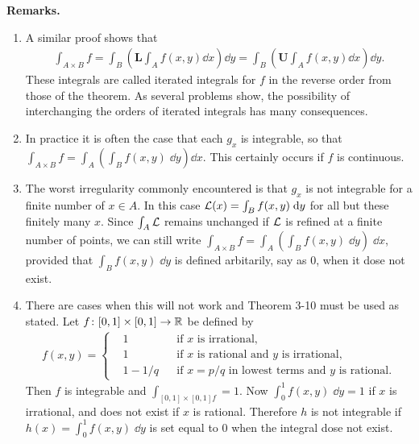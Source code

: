 \noindent\textbf{Remarks.} 
\begin{enumerate}[label={\textup{\arabic*.\,}}]
    \item A similar proof shows that
        \begin{align*}
            \int_{A\times B}f
            = \int_{B}\left(\mathbf{L}\int_{A}f(x,y)\dd x\right)\dd y
            = \int_{B}\left(\mathbf{U}\int_{A}f(x,y)\dd x\right)\dd y.
        \end{align*}
        These integrals are called iterated integrals for $f$ in the reverse
        order from those of the theorem. As several problems show,
        the possibility of interchanging the orders of iterated integrals
        has many consequences.
    \item In practice it is often the case that each $g_x$ is integrable, so that
        $\int_{A\times B} f = \int_A\left(\int_B f(x, y)\;\dd y\right)\dd x$. This certainly
        occurs if $f$ is continuous.
    \item The worst irregularity commonly encountered is that $g_x$
        is not integrable for a finite number of $x\in A$. In this case 
        $\mathcal{L}(x) =\int_B f(x, y) \;\mathrm{d} y$ for all but these finitely many $x$. Since 
        $\int_A \mathcal{{L}}$ remains unchanged if $\mathcal{L}$ is refined at a finite number of 
        points, we can still write $\int_{A\times B} f = \int_A \left(\int_B f(x, y)\;\dd y\right)\;\dd x$,
        provided that $\int_B f(x, y)\; \dd y$ is defined arbitarily, say as 0, when it dose not exist.
    \item There are cases when this will not work and Theorem 3-10
    must be used as stated. Let $f\colon{}[0,1]\times [0,1]\to\mathbb{R}$ be defined by 
    \begin{align*}
        f(x,y)
        = \left\{\begin{aligned}
            & 1 && \text{if $x$ is irrational}, \\
            & 1 && \text{if $x$ is rational and $y$ is irrational}, \\
            & 1-1/q && \text{if $x=p/q$ in lowest terms and $y$ is rational}.
        \end{aligned}\right.
    \end{align*}
    Then $f$  is integrable and $\int_{[0,1]\times [0,1] f} = 1$. Now $\int_0^1f(x, y)\;\dd y=1$ if 
    $x$ is irrational, and does not exist if $x$ is rational. Therefore $h$ is not integrable 
    if $h(x) = \int_0^1 f(x, y)\;\dd y$ is set equal to 0 when the integral dose not exist. 

\end{enumerate}
